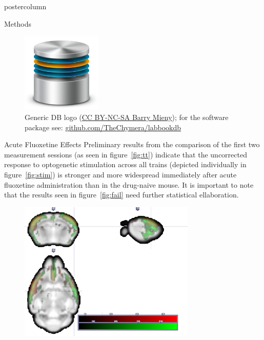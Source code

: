 \documentclass{beamer}
\begin{document}
\begin{frame}
\begin{columns}
\begin{column}{.48\textwidth}
\begin{beamercolorbox}[center]{postercolumn}
{\begin{myblock}{Methods}
\begin{figure}
\begin{minipage}{0.43\textwidth}
							\end{minipage}
							\hspace{1em}
							\begin{minipage}{0.45\textwidth}
								\centering\includegraphics[width=0.34\textwidth]{img/db.png}
								\caption{Generic DB logo
									(\href{https://creativecommons.org/licenses/by-nc-sa/3.0/}{CC BY-NC-SA Barry Mieny});
									for the software package see:
									\href{https://github.com/TheChymera/labbookdb}{github.com/TheChymera/labbookdb}}
							\end{minipage}
						\end{figure}
					\end{myblock}%
					\begin{myblock}{Acute Fluoxetine Effects}
						Preliminary results from the comparison of the first two
						measurement sessions (as seen in figure~\ref{fig:tt}) indicate
						that the uncorrected response to optogenetic stimulation across
						all trains (depicted individually in figure~\ref{fig:stim}) is
						stronger and more widespread immediately after acute fluoxetine
						administration than in the drug-naive mouse.
						It is important to note that the results seen in
						figure~\ref{fig:fail} need further statistical ellaboration.
						\begin{figure}
							\begin{minipage}{0.85\textwidth}
								\centering\includegraphics[width=0.75\textwidth]{img/fail.png}

\end{minipage}
\end{figure}
\end{myblock}}
\end{beamercolorbox}
\end{column}
\end{columns}
\end{frame}
\end{document}

